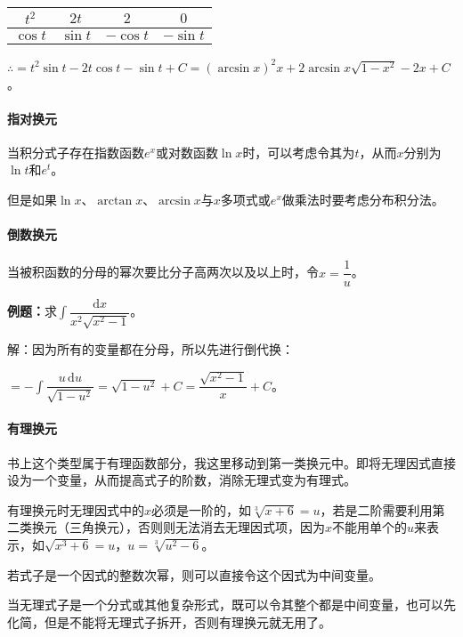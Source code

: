 \documentclass[UTF8, 12pt]{ctexart}
\begin{document}
\begin{tabular}{|c|c|c|c|}
    \hline
    $t^2$ & $2t$ & $2$ & $0$ \\ \hline
    $\cos t$ & $\sin t$ & $-\cos t$ & $-\sin t$ \\
    \hline
\end{tabular} \medskip

$\therefore=t^2\sin t-2t\cos t-\sin t+C=(\arcsin x)^2x+2\arcsin x\sqrt{1-x^2}-2x+C$。

\paragraph{指对换元} \leavevmode \medskip

当积分式子存在指数函数$e^x$或对数函数$\ln x$时，可以考虑令其为$t$，从而$x$分别为$\ln t$和$e^t$。

但是如果$\ln x$、$\arctan x$、$\arcsin x$与$x$多项式或$e^x$做乘法时要考虑分布积分法。

\paragraph{倒数换元} \leavevmode \medskip

当被积函数的分母的幂次要比分子高两次以及以上时，令$x=\dfrac{1}{u}$。

\textbf{例题：}求$\displaystyle{\int\dfrac{\textrm{d}x}{x^2\sqrt{x^2-1}}}$。\medskip

解：因为所有的变量都在分母，所以先进行倒代换：\medskip

$=-\displaystyle{\int\dfrac{u\,\textrm{d}u}{\sqrt{1-u^2}}}=\sqrt{1-u^2}+C=\dfrac{\sqrt{x^2-1}}{x}+C$。

\paragraph{有理换元} \leavevmode \medskip

书上这个类型属于有理函数部分，我这里移动到第一类换元中。即将无理因式直接设为一个变量，从而提高式子的阶数，消除无理式变为有理式。

有理换元时无理因式中的$x$必须是一阶的，如$\sqrt[3]{x+6}=u$，若是二阶需要利用第二类换元（三角换元），否则则无法消去无理因式项，因为$x$不能用单个的$u$来表示，如$\sqrt{x^3+6}=u$，$u=\sqrt[3]{u^2-6}$。

若式子是一个因式的整数次幂，则可以直接令这个因式为中间变量。

当无理式子是一个分式或其他复杂形式，既可以令其整个都是中间变量，也可以先化简，但是不能将无理式子拆开，否则有理换元就无用了。
\end{document}
